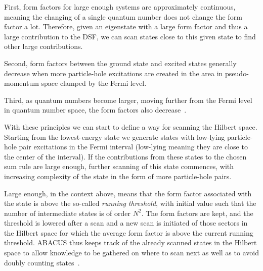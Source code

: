 \documentclass[11pt, a4paper]{report} %
\begin{document}
First, form factors for large enough systems are approximately continuous, meaning the changing of a single quantum number does not change the form factor a lot.
Therefore, given an eigenstate with a large form factor and thus a large contribution to the DSF, we can scan states close to this given state to find other large contributions.

Second, form factors between the ground state and excited states generally decrease when more particle-hole excitations are created in the area in pseudo-momentum space clamped by the Fermi level.

Third, as quantum numbers become larger, moving further from the Fermi level in quantum number space, the form factors also decrease~\cite{Caux2009}.

With these principles we can start to define a way for scanning the Hilbert space.
Starting from the lowest-energy state we generate states with low-lying particle-hole pair excitations in the Fermi interval (low-lying meaning they are close to the center of the interval).
If the contributions from these states to the chosen sum rule are large enough, further scanning of this state commences, with increasing complexity of the state in the form of more particle-hole pairs.

Large enough, in the context above, means that the form factor associated with the state is above the so-called \textit{running threshold}, with initial value such that the number of intermediate states is of order \(N^2\).
The form factors are kept, and the threshold is lowered after a scan and a new scan is initiated of those sectors in the Hilbert space for which the average form factor is above the current running threshold.
ABACUS thus keeps track of the already scanned states in the Hilbert space to allow knowledge to be gathered on where to scan next as well as to avoid doubly counting states~\cite{Caux2009}.
\end{document}
